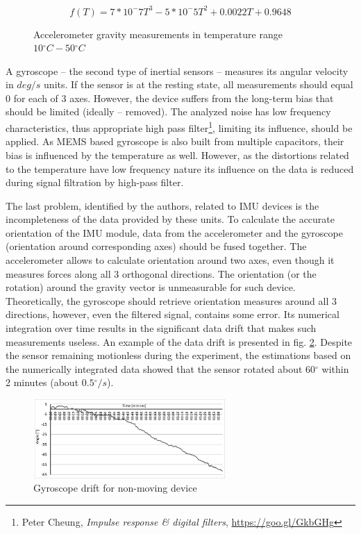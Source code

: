 \documentclass[sensors,article,submit,moreauthors,pdftex,10pt,a4paper]{mdpi}
\newcommand{\degree}{\ensuremath{{}^{\circ}}\xspace}
\begin{document}
	\begin{equation}
		f(T) = 7*10^-7 T^3 - 5*10^-5 T^2 + 0.0022T + 0.9648
		\label{eq:kinect:gravityTempModel}
	\end{equation}
	
	\begin{figure}[H] %
		\centering
			
		\caption{Accelerometer gravity measurements in temperature range $10\degree C - 50\degree C$}
		\label{fig:imu:tmep}
	\end{figure}
	
	A gyroscope – the second type of inertial sensors – measures its angular velocity in $deg/s$  units. If the sensor is at the resting state, all measurements should equal 0 for each of 3 axes. However, the device suffers from the long-term bias that should be limited (ideally – removed). The analyzed noise has low frequency characteristics, thus appropriate high pass filter\footnote{Peter Cheung, \textit{Impulse response \& digital filters}, \url{https://goo.gl/GkbGHg}}, limiting its influence, should be applied. As MEMS based gyroscope is also built from multiple capacitors, their bias is influenced by the temperature as well. However, as the distortions related to the temperature have low frequency nature its influence on the data is reduced during signal filtration by high-pass filter. 
	
	The last problem, identified by the authors, related to IMU devices is the incompleteness of the data provided by these units. To calculate the accurate orientation of the IMU module, data from the accelerometer and the gyroscope (orientation around corresponding axes) should be fused together. The accelerometer allows to calculate orientation around two axes, even though it measures forces along all 3 orthogonal directions. The orientation (or the rotation) around the gravity vector is unmeasurable for such device. Theoretically, the gyroscope should retrieve orientation measures around all 3 directions, however, even the filtered signal, contains some error. Its numerical integration over time results in the significant data drift that makes such measurements useless. An example of the data drift is presented in fig. \ref{fig:imu:drift}. Despite the sensor remaining motionless during the experiment, the estimations based on the numerically integrated data showed that the sensor rotated about $60\degree$ within 2 minutes (about $0.5\degree/s$).
	\begin{figure}[H] %
		\centering
		\includegraphics[width=0.65\textwidth]{Figure7.png}
		\caption{Gyroscope drift for non-moving device}
		\label{fig:imu:drift}
	\end{figure}
	
\end{document}
